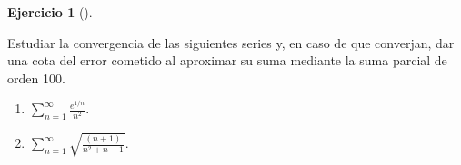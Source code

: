 \documentclass[
  a4paper,
]{scrreport}
\providecommand{\tightlist}{%
  \setlength{\itemsep}{0pt}\setlength{\parskip}{0pt}}\usepackage{longtable,booktabs,array}
\theoremstyle{definition}
\newtheorem{exercise}{Ejercicio}[chapter]
\theoremstyle{remark}
\begin{document}
\begin{exercise}[]\protect\hypertarget{exr-5}{}\label{exr-5}

Estudiar la convergencia de las siguientes series y, en caso de que
converjan, dar una cota del error cometido al aproximar su suma mediante
la suma parcial de orden 100.

\begin{enumerate}
\def\labelenumi{\alph{enumi}.}
\tightlist
\item
  \(\displaystyle \sum_{n=1}^\infty \frac{e^{1/n}}{n^2}\).
\item
  \(\displaystyle \sum_{n=1}^\infty \sqrt{\frac{(n+1)}{n^2+n-1}}\).
\end{enumerate}

\end{exercise}
\end{document}
